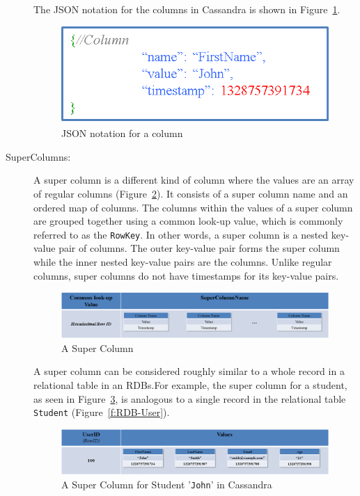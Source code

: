 \begin{description}
The JSON notation for the columns in Cassandra is shown in Figure~\ref{f:column-JSON}.

\begin{figure}[H]
	\centering
	\includegraphics[width=.4\textwidth]{./figure/Example/Column_JSON.png}
	\caption{JSON notation for a column}\label{f:column-JSON}
\end{figure}
% 

\item [SuperColumns:] A super column is a different kind of column where the
values are an array of regular columns (Figure~\ref{f:supercolumn}). It consists of a super
column name and an ordered map of columns. The columns within the values of a
super column are grouped together using a common look-up value, which is
commonly referred to as the \texttt{RowKey}. In other words, a super column is a
nested key-value pair of columns. The outer key-value pair forms the super column while the inner
nested key-value pairs are the columns. Unlike regular columns, super columns do
not have timestamps for its key-value pairs. 

\begin{figure}[H]
	\centering
	\includegraphics[width=.8\textwidth]{./figure/Example/SuperColumn.png}
	\caption{A Super Column }\label{f:supercolumn}
\end{figure}

A super column can be considered roughly similar to a whole record in a
relational table in an \acp{RDB}.For example, the super column for a
student, as seen in Figure~\ref{f:supercolumn-John}, is analogous to a single
record in the relational table \texttt{Student} (Figure~\ref{f:RDB-User}).

\begin{figure}[H]
	\centering
	\includegraphics[width=.8\textwidth]{./figure/Example/SuperColumn_John.png}
	\caption{A Super Column for Student '\texttt{John}' in
	Cassandra}\label{f:supercolumn-John}
\end{figure}


\end{description}
